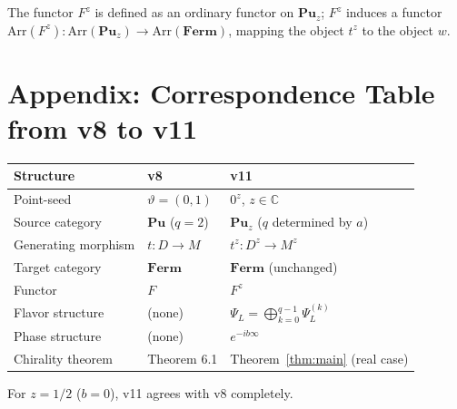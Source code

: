 \documentclass[11pt]{article}
\theoremstyle{plain}
\theoremstyle{definition}
\newcommand{\Cat}{\mathbf}
\begin{document}
The functor $F^z$ is defined as an ordinary functor on $\Cat{Pu}_z$; $F^z$
induces a functor
$\mathrm{Arr}(F^z): \mathrm{Arr}(\Cat{Pu}_z) \to \mathrm{Arr}(\Cat{Ferm})$,
mapping the object $t^z$ to the object $w$.

\section{Appendix: Correspondence Table from v8 to v11}

\begin{center}
\begin{tabular}{lll}
\hline
\textbf{Structure} & \textbf{v8} & \textbf{v11} \\
\hline
Point-seed & $\vartheta = (0,1)$ & $0^z$, $z\in\mathbb{C}$ \\
Source category & $\Cat{Pu}$ ($q=2$) & $\Cat{Pu}_z$ ($q$ determined by $a$) \\
Generating morphism & $t: D\to M$ & $t^z: D^z\to M^z$ \\
Target category & $\Cat{Ferm}$ & $\Cat{Ferm}$ (unchanged) \\
Functor & $F$ & $F^z$ \\
Flavor structure & (none) & $\Psi_L = \bigoplus_{k=0}^{q-1}\Psi_L^{(k)}$ \\
Phase structure & (none) & $e^{-ib\infty}$ \\
Chirality theorem & Theorem 6.1 & Theorem~\ref{thm:main} (real case) \\
\hline
\end{tabular}
\end{center}

For $z = 1/2$ ($b=0$), v11 agrees with v8 completely.
\end{document}
